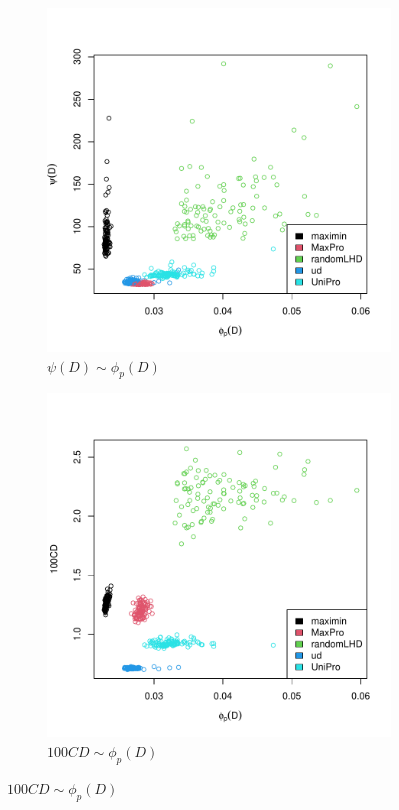 \documentclass [PhD] {package/uclathes}
\begin{document}
\begin{figure}%
\begin{adjustwidth}{-2cm}{-2cm}
\captionsetup[subfigure]{labelformat=empty}
\centering
\begin{subfigure}[b]{0.3\textwidth}
\centering
\caption{$\psi(D)\sim\phi_p(D)$}
\includegraphics[width=\textwidth]{chapters/EGO/pdfs/phi_p_psi}
\end{subfigure}
\begin{subfigure}[b]{0.3\textwidth}
\centering
\caption{$100CD \sim \phi_p(D)$}
\includegraphics[width=\textwidth]{chapters/EGO/pdfs/phi_p_cd}

\end{subfigure}
\end{adjustwidth}
\end{figure}
\end{document}
